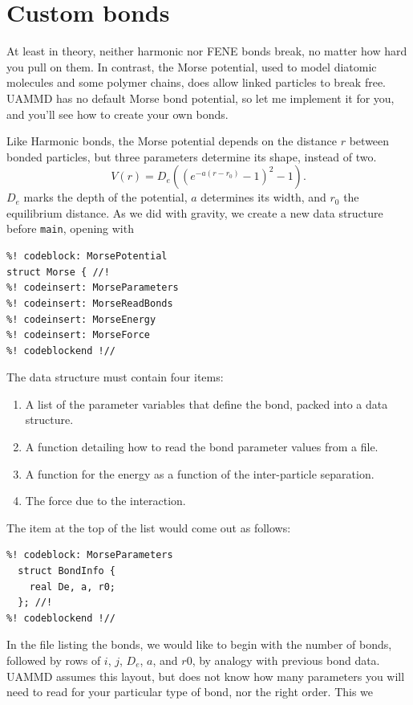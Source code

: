 \section{Custom bonds}

At least in theory, neither harmonic nor FENE bonds break, no matter how hard
you pull on them. In contrast, the Morse potential, used to model diatomic
molecules and some polymer chains, does allow linked particles to break free.
UAMMD has no default Morse bond potential, so let me implement it for you, and 
you'll see how to create your own bonds.

Like Harmonic bonds, the Morse potential depends on the distance $r$ between 
bonded particles, but three parameters determine its shape, instead of two.
\begin{equation*}
  V(r) = D_e\left(\left(e^{-a(r - r_0)} - 1\right)^2 - 1\right).
\end{equation*}
$D_e$ marks the depth of the potential, $a$ determines its width, and $r_0$ the
equilibrium distance. As we did with gravity, we create a new data structure
before \texttt{main}, opening with
\begin{lstlisting}
%! codeblock: MorsePotential
struct Morse { //!
%! codeinsert: MorseParameters
%! codeinsert: MorseReadBonds
%! codeinsert: MorseEnergy
%! codeinsert: MorseForce
%! codeblockend !//
\end{lstlisting}
The data structure must contain four items:
\begin{enumerate}
  \item A list of the parameter variables that define the bond, packed into a
        data structure.
  \item A function detailing how to read the bond parameter values from a file.
  \item A function for the energy as a function of the inter-particle 
        separation.
  \item The force due to the interaction.
\end{enumerate}
The item at the top of the list would come out as follows:
\begin{lstlisting}
%! codeblock: MorseParameters
  struct BondInfo {
    real De, a, r0;
  }; //!
%! codeblockend !//
\end{lstlisting}
In the file listing the bonds, we would like to begin with the number of bonds,
followed by rows of $i$, $j$, $D_e$, $a$, and $r0$, by analogy with previous
bond data. UAMMD assumes this layout, but does not know how many parameters you
will need to read for your particular type of bond, nor the right order. This we
